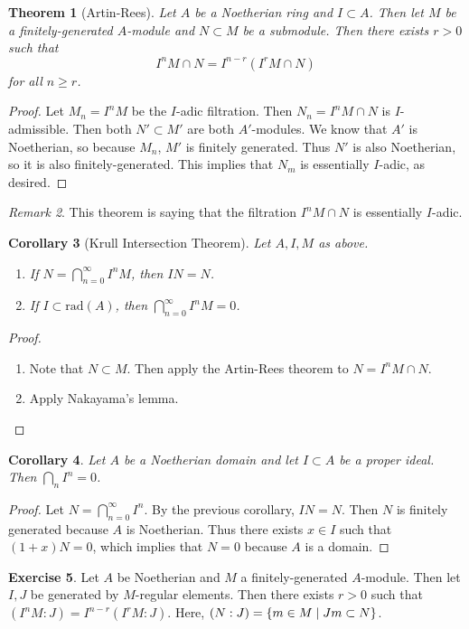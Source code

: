 \documentclass[leqno, openany]{memoir}
\newtheorem{thm}{Theorem}[section]
\newtheorem{cor}[thm]{Corollary}
\theoremstyle{definition}
\newtheorem{exer}[thm]{Exercise}
\theoremstyle{remark}
\newtheorem{rmk}[thm]{Remark}
\theoremstyle{plain}
\theoremstyle{definition}
\theoremstyle{remark}
\newcommand{\mr}[1]{\mathrm{#1}}
\begin{document}
\begin{thm}[Artin-Rees]
    Let $A$ be a Noetherian ring and $I \subset A$. Then let $M$ be a finitely-generated $A$-module and $N \subset M$ be a submodule. Then there exists $r > 0$ such that
    \[ I^n M \cap N = I^{n-r} (I^r M \cap N) \]
    for all $n \geq r$.
\end{thm}

\begin{proof}
    Let $M_n = I^n M$ be the $I$-adic filtration. Then $N_n = I^n M \cap N$ is $I$-admissible. Then both $N' \subset M'$ are both $A'$-modules. We know that $A'$ is Noetherian, so because $M_n$, $M'$ is finitely generated. Thus $N'$ is also Noetherian, so it is also finitely-generated. This implies that $N_m$ is essentially $I$-adic, as desired.
\end{proof}

\begin{rmk}
    This theorem is saying that the filtration $I^n M \cap N$ is essentially $I$-adic.
\end{rmk}

\begin{cor}[Krull Intersection Theorem]
    Let $A, I, M$ as above.
    \begin{enumerate}
        \item If $N = \bigcap_{n=0}^{\infty } I^n M$, then $IN = N$.
        \item If $I \subset \mr{rad}(A)$, then $\bigcap_{n=0}^{\infty} I^n M = 0$.
    \end{enumerate}
\end{cor}

\begin{proof}
    \begin{enumerate}
        \item Note that $N \subset M$. Then apply the Artin-Rees theorem to $N = I^n M \cap N$.
        \item Apply Nakayama's lemma. \qedhere
    \end{enumerate}
\end{proof}

\begin{cor}
    Let $A$ be a Noetherian domain and let $I \subset A$ be a proper ideal. Then $\bigcap_n I^n = 0$.
\end{cor}

\begin{proof}
    Let $N = \bigcap_{n=0}^{\infty} I^n$. By the previous corollary, $IN = N$. Then $N$ is finitely generated because $A$ is Noetherian. Thus there exists $x \in I$ such that $(1+x)N = 0$, which implies that $N = 0$ because $A$ is a domain.
\end{proof}

\begin{exer}
    Let $A$ be Noetherian and $M$ a finitely-generated $A$-module. Then let $I, J$ be generated by $M$-regular elements. Then there exists $r > 0$ such that $(I^n M : J) = I^{n-r} (I^r M : J)$. Here, $(N:J) = \qty{ m \in M \mid Jm \subset N }$.
\end{exer}
\end{document}
